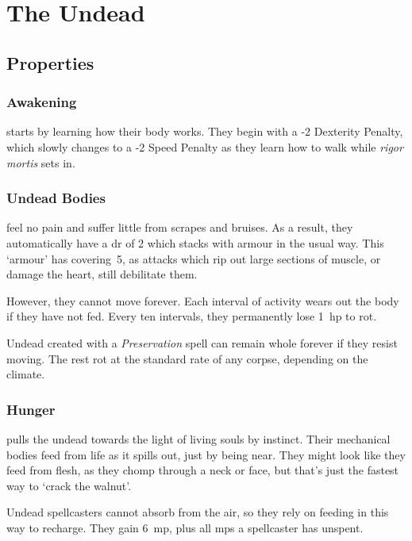 \section[The Undead]{The Undead \D}
\label{undead}
\begin{multicols}{2}
\subsection{Properties}

\subsubsection{Awakening}
starts by learning how their body works.
They begin with a -2 Dexterity Penalty, which slowly changes to a -2 Speed Penalty as they learn how to walk while \textit{rigor mortis} sets in.

\subsubsection{Undead Bodies}
feel no pain and suffer little from scrapes and bruises.
As a result, they automatically have a \gls{dr} of 2 which stacks with armour in the usual way.%
This `armour' has \gls{covering}~5, as attacks which rip out large sections of muscle, or damage the heart, still debilitate them.

However, they cannot move forever.
Each \gls{interval} of activity wears out the body if they have not fed.
Every ten \glspl{interval}, they permanently lose 1~\gls{hp} to rot.

Undead created with a \textit{Preservation} spell can remain whole forever if they resist moving.
The rest rot at the standard rate of any corpse, depending on the climate.

\subsubsection{Hunger}
pulls the undead towards the light of living souls by instinct.
Their mechanical bodies feed from life as it spills out, just by being near.
They might look like they feed from flesh, as they chomp through a neck or face, but that's just the fastest way to `crack the walnut'.

Undead spellcasters cannot absorb  from the air, so they rely on feeding in this way to recharge.
They gain 6~\gls{mp}, plus all \glspl{mp} a spellcaster has unspent.


\end{multicols}

